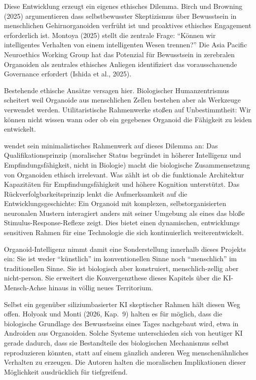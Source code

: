 \documentclass[acmlarge, noacm]{acmart}
\begin{document}
Diese Entwicklung erzeugt ein eigenes ethisches Dilemma. Birch und Browning (2025) argumentieren dass selbstbewusster Skeptizismus über Bewusstsein in menschlichen Gehirnorganoiden verfrüht ist und proaktives ethisches Engagement erforderlich ist. Montoya (2025) stellt die zentrale Frage: ``Können wir intelligentes Verhalten von einem intelligenten Wesen trennen?'' Die Asia Pacific Neuroethics Working Group hat das Potenzial für Bewusstsein in zerebralen Organoiden als zentrales ethisches Anliegen identifiziert das vorausschauende Governance erfordert (Ishida et al., 2025).

Bestehende ethische Ansätze versagen hier. Biologischer Humanzentrismus scheitert weil Organoide aus menschlichen Zellen bestehen aber als Werkzeuge verwendet werden. Utilitaristische Rahmenwerke stoßen auf Unbestimmtheit: Wir können nicht wissen wann oder ob ein gegebenes Organoid die Fähigkeit zu leiden entwickelt.

\citet{wang2026} wendet sein minimalistisches Rahmenwerk auf dieses Dilemma an: Das Qualifikationsprinzip (moralischer Status begründet in höherer Intelligenz und Empfindungsfähigkeit, nicht in Biologie) macht die biologische Zusammensetzung von Organoiden ethisch irrelevant. Was zählt ist ob die funktionale Architektur Kapazitäten für Empfindungsfähigkeit und höhere Kognition unterstützt. Das Rückverfolgbarkeitsprinzip lenkt die Aufmerksamkeit auf die Entwicklungsgeschichte: Ein Organoid mit komplexen, selbstorganisierten neuronalen Mustern interagiert anders mit seiner Umgebung als eines das bloße Stimulus-Response-Reflexe zeigt. Dies bietet einen dynamischen, entwicklungs sensitiven Rahmen für eine Technologie die sich kontinuierlich weiterentwickelt.

Organoid-Intelligenz nimmt damit eine Sonderstellung innerhalb dieses Projekts ein: Sie ist weder ``künstlich'' im konventionellen Sinne noch ``menschlich'' im traditionellen Sinne. Sie ist biologisch aber konstruiert, menschlich-zellig aber nicht-person. Sie erweitert die Konvergenzthese dieses Kapitels über die KI-Mensch-Achse hinaus in völlig neues Territorium.

Selbst ein gegenüber siliziumbasierter KI skeptischer Rahmen hält diesen Weg offen. Holyoak und Monti (2026, Kap.~9) \cite{holyoakmonti2026} halten es für möglich, dass die biologische Grundlage des Bewusstseins eines Tages nachgebaut wird, etwa in Androiden aus Organoiden. Solche Systeme unterschieden sich von heutiger KI gerade dadurch, dass sie Bestandteile des biologischen Mechanismus selbst reproduzieren könnten, statt auf einem gänzlich anderen Weg menschenähnliches Verhalten zu erzeugen. Die Autoren halten die moralischen Implikationen dieser Möglichkeit ausdrücklich für tiefgreifend.
\end{document}
